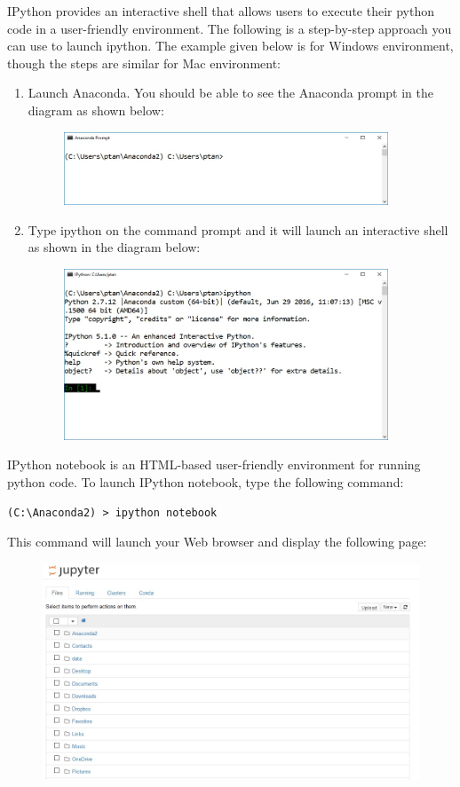 \documentclass{article}
\begin{document}
IPython provides an interactive shell that allows users to execute their python code in a user-friendly environment.
The following is a step-by-step approach you can use to launch ipython. The example given below is for Windows environment, though the steps are similar for Mac environment:
\begin{enumerate}
\item Launch Anaconda. You should be able to see the Anaconda prompt in the diagram as shown below:
\begin{figure}[h!]
\centering
  \includegraphics[width=3.8in]{anaconda.jpg}\\
\end{figure}
\newpage
\item Type ipython on the command prompt and it will launch an interactive shell as shown in the diagram below:
\begin{figure}[h!]
\centering
  \includegraphics[width=3.8in]{ipython.jpg}\\
\end{figure}
\end{enumerate}

IPython notebook is an HTML-based user-friendly environment for running python code. To launch IPython notebook, type the following command:
\begin{verbatim}
(C:\Anaconda2) > ipython notebook
\end{verbatim}
This command will launch your Web browser and display the following page:
\begin{figure}[h!]
\centering
  \includegraphics[width=4.5in]{notebook.jpg}\\
\end{figure}
\newpage
\end{document}
